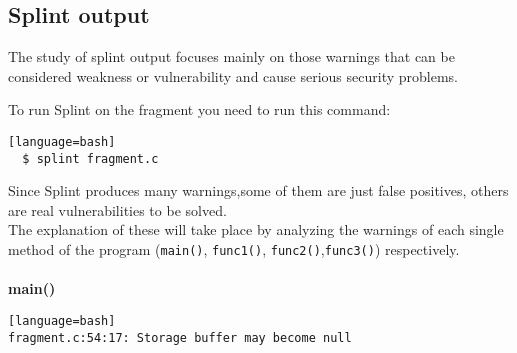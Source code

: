 \documentclass[a4paper,12pt]{article}
\newenvironment{SpecialPar}
  {\begin{shaded}}
  {\end{shaded}}
\begin{document}
\subsection{Splint output}

\begin{SpecialPar}
\noindent
The study of splint output focuses mainly on those warnings that can be considered weakness or vulnerability and cause serious security problems.
\end{SpecialPar}
\noindent
To run Splint on the fragment you need to run this command:
\begin{lstlisting}[style=DOS][language=bash]
  $ splint fragment.c
\end{lstlisting}
Since Splint produces many warnings,some of them are just false positives, others are real vulnerabilities to be solved.\\
The explanation of these will take place by analyzing the warnings of each single method of the program (\texttt{main()}, \texttt{func1()}, \texttt{func2()},\texttt{func3()}) respectively.\\
\\
\noindent
\textbf{main()}\\

\begin{lstlisting}[style=DOS][language=bash]
fragment.c:54:17: Storage buffer may become null
\end{lstlisting}
\end{document}
